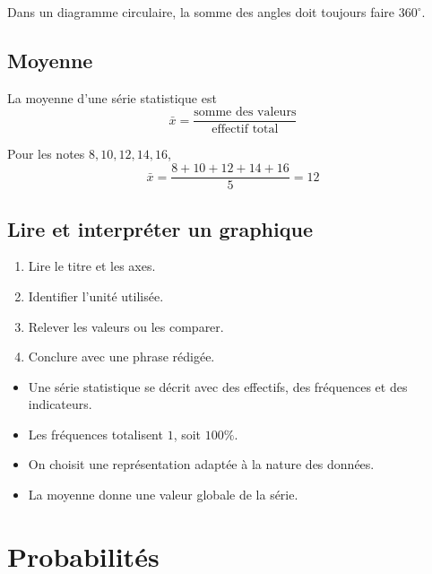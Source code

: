 \documentclass[11pt,a4paper,twoside]{book}
\begin{document}
\begin{attentionbox}
Dans un diagramme circulaire, la somme des angles doit toujours faire \(360^\circ\).
\end{attentionbox}

\section{Moyenne}
\begin{definitionbox}
La moyenne d'une série statistique est
\[
\bar{x}=\frac{\text{somme des valeurs}}{\text{effectif total}}
\]
\end{definitionbox}

\begin{exemplebox}
Pour les notes \(8,10,12,14,16\),
\[
\bar{x}=\frac{8+10+12+14+16}{5}=12
\]
\end{exemplebox}

\section{Lire et interpréter un graphique}
\begin{methodebox}
\begin{enumerate}
\item Lire le titre et les axes.
\item Identifier l'unité utilisée.
\item Relever les valeurs ou les comparer.
\item Conclure avec une phrase rédigée.
\end{enumerate}
\end{methodebox}

\begin{retenirbox}
\begin{itemize}
\item Une série statistique se décrit avec des effectifs, des fréquences et des indicateurs.
\item Les fréquences totalisent \(1\), soit \(100\%\).
\item On choisit une représentation adaptée à la nature des données.
\item La moyenne donne une valeur globale de la série.
\end{itemize}
\end{retenirbox}

\chapter{Probabilités}
\end{document}
